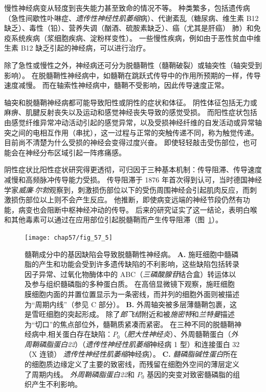 慢性神经病变从轻度到丧失能力甚至致命的情况不等。
种类繁多，包括遗传病（急性间歇性卟啉症、\textit{遗传性神经性肌萎缩}病）、代谢紊乱（糖尿病、维生素 B12 缺乏）、毒性（铅）、营养失调（酗酒、硫胺素缺乏）、癌（尤其是肝癌） 肺）和免疫系统疾病（浆细胞疾病、淀粉样变性）。
一些慢性疾病，例如由于恶性贫血中维生素 B12 缺乏引起的神经病，可以进行治疗。


除了急性或慢性之外，神经病还可分为脱髓鞘性（髓鞘破裂）或轴突性（轴突受到影响）。
在脱髓鞘性神经病中，如髓鞘在跳跃式传导中的作用所预期的一样，传导速度减慢。
而在轴索性神经病中，髓鞘不受影响，因此传导速度正常。


轴突和脱髓鞘神经病都可能导致阳性或阴性的症状和体征。
阴性体征包括无力或麻痹、肌腱反射丧失以及运动和感觉神经丧失导致的感觉受损。
而阳性症状包括由感觉纤维异常冲动活动引起的感觉异常，以及受损神经纤维的自发活动或异常轴突之间的电相互作用（串扰），这一过程与正常的突触传递不同，称为触觉传递。
目前尚不清楚为什么受损的神经会变得过度兴奋。
即使轻轻敲击受伤部位，也可能会在神经分布区域引起一阵疼痛感。


阴性症状比阳性症状研究得更透彻，可归因于三种基本机制：传导阻滞、传导速度减慢和高频脉冲传导能力受损。
传导阻滞于 1876 年首次得到认可，当时德国神经学家\textit{威廉$\cdot$尔勃}观察到，刺激损伤部位以下的受伤周围神经会引起肌肉反应，而刺激损伤部位以上则不会产生反应。
他推断，即使病变远端的神经节段仍然有功能，病变也会阻断中枢神经冲动的传导。
后来的研究证实了这一结论，表明白喉和其他毒素可以通过在应用部位引起脱髓鞘而产生传导阻滞（图~\ref{fig:57_5}）。


\begin{figure}[htbp]
	\centering
	\texttt{[image: chap57/fig\_57\_5]}
	\caption{髓鞘成分中的基因缺陷会导致脱髓鞘性神经病。
		\textbf{A.} 施旺细胞中髓磷脂的产生和功能会受到许多遗传缺陷的不利影响，这些缺陷包括转录因子异常、过氧化物酶体中的 ABC（\textit{三磷酸腺苷}结合盒）转运体以及参与组织髓磷脂的多种蛋白质。
		在高倍显微镜下观察，施旺细胞膜细胞内面的并置位置显示为一条密线，而并列的细胞外面则被描述为“周期内线”（参见 C 部分）\cite{lupski1998molecular}。 
		\textbf{B.} 外周轴突被多层薄髓鞘包裹，这是雪旺细胞的突起形成。
		除了\textit{郎飞结}附近和被\textit{施密特}和\textit{兰特曼}描述为“切口”的焦点部位外，髓鞘质紧凑而紧密。
		在三种不同的脱髓鞘神经病中,相关蛋白存在缺陷：$ P_0 $（\textit{肥大性神经炎}）、外周髓鞘蛋白（\textit{外周鞘磷脂蛋白22}）（\textit{遗传性神经性肌萎缩}神经病 1 型）和连接蛋白 32（X 连锁） \textit{遗传性神经性肌萎缩}神经病）\cite{lupski1998molecular}。
		\textbf{C.} \textit{髓磷脂碱性蛋白}所在的细胞质边缘定义了主要的致密线，而残留在细胞外空间的薄层定义了周期内线。
		\textit{外周鞘磷脂蛋白22}和 $P_0$ 基因的突变对致密髓磷脂的组织产生不利影响\cite{brown2002inherited}。}
	\label{fig:57_5}
\end{figure}


